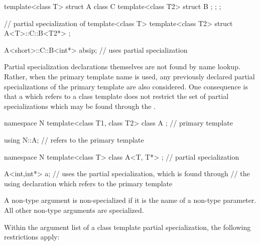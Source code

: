 \begin{codeblock}
template<class T> struct A {
	class C {
		template<class T2> struct B { };
	};
};

// partial specialization of 
template<class T> template<class T2>
	struct A<T>::C::B<T2*> { };

A<short>::C::B<int*> absip;     // uses partial specialization
\end{codeblock}
\exitexampleb

\pnum
Partial specialization declarations themselves are not found by name lookup.
Rather, when the primary template name is used, any previously declared partial
specializations of the primary template are also considered.
One consequence is
that a
which refers to a class template does not restrict the set of partial specializations
which may be found through the
.
\enterexample

\begin{codeblock}
namespace N {
	template<class T1, class T2> class A { };       // primary template
}

using N::A;                     // refers to the primary template

namespace N {
	template<class T> class A<T, T*> { };	// partial specialization
}

A<int,int*> a;			// uses the partial specialization, which is found through
                                // the using declaration which refers to the primary template
\end{codeblock}
\exitexampleb

\pnum
A non-type argument is non-specialized if it is the name of a non-type
parameter.
All other non-type arguments are specialized.

\pnum
Within the argument list of a class template partial specialization,
the following restrictions apply:

